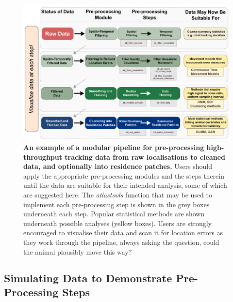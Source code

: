 \begin{refsection}

    \begin{figure}
        \centering
        \begin{addmargin}{-.3\textwidth}%
        \centering
        \captionsetup{width=13.5cm}
        \includegraphics[width=13.5cm]{figures/preprocessing/fig_02.png}
        \end{addmargin}
        \caption{
            \textbf{An example of a modular pipeline for pre-processing high-throughput tracking data from raw localisations to cleaned data, and optionally into residence patches.}
            Users should apply the appropriate pre-processing modules and the steps therein until the data are suitable for their intended analysis, some of which are suggested here.
            The \textit{atlastools} function that may be used to implement each pre-processing step is shown in the grey boxes underneath each step.
            Popular statistical methods are shown underneath possible analyses (yellow boxes).
            Users are strongly encouraged to visualise their data and scan it for location errors as they work through the pipeline, always asking the question, could the animal plausibly move this way?
        }
        \label{fig2}
    \end{figure}

    \subsection*{Simulating Data to Demonstrate Pre-Processing Steps}


\end{refsection}
